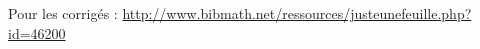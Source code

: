 
\vspace{1em}

Pour les corrigés : \url{http://www.bibmath.net/ressources/justeunefeuille.php?id=46200} 

